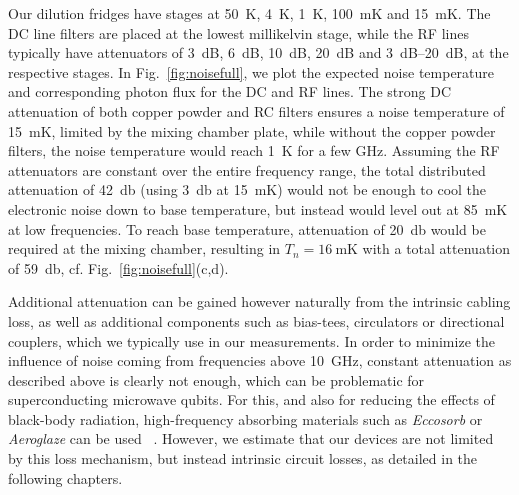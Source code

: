 Our dilution fridges have stages at \SI{50}{\kelvin}, \SI{4}{\kelvin}, \SI{1}{\kelvin}, \SI{100}{\milli\kelvin} and \SI{15}{\milli\kelvin}.
%
The DC line filters are placed at the lowest millikelvin stage, while the RF lines typically have attenuators of \SI{3}{dB}, \SI{6}{dB}, \SI{10}{dB}, \SI{20}{dB} and \SIrange{3}{20}{dB}, at the respective stages.
%
In Fig.~\ref{fig:noisefull}, we plot the expected noise temperature and corresponding photon flux for the DC and RF lines.
%
The strong DC attenuation of both copper powder and RC filters ensures a noise temperature of \SI{15}{\milli\kelvin}, limited by the mixing chamber plate, while without the copper powder filters, the noise temperature would reach \SI{1}{\kelvin} for a few \si{\giga\hertz}.
%
Assuming the RF attenuators are constant over the entire frequency range, the total distributed attenuation of \SI{42}{\decibel} (using \SI{3}{\decibel} at \SI{15}{\milli\kelvin}) would not be enough to cool the electronic noise down to base temperature, but instead would level out at \SI{85}{\milli\kelvin} at low frequencies.
%
To reach base temperature, attenuation of \SI{20}{\decibel} would be required at the mixing chamber, resulting in $T_n=\SI{16}{\milli\kelvin}$ with a total attenuation of \SI{59}{\decibel}, cf. Fig.~\ref{fig:noisefull}(c,d).

Additional attenuation can be gained however naturally from the intrinsic cabling loss, as well as additional components such as bias-tees, circulators or directional couplers, which we typically use in our measurements.
%
In order to minimize the influence of noise coming from frequencies above \SI{10}{\giga\hertz}, constant attenuation as described above is clearly not enough, which can be problematic for superconducting microwave qubits.
%
For this, and also for reducing the effects of black-body radiation, high-frequency absorbing materials such as \textit{Eccosorb} or \textit{Aeroglaze} can be used~ \cite{perskyReviewBlackSurfaces1999,barendsMinimizingQuasiparticleGeneration2011,baselmansUltraLowBackground2012,vanwoerkomOneMinuteParity2015,krinnerEngineeringCryogenicSetups2019}.
%
However, we estimate that our devices are not limited by this loss mechanism, but instead intrinsic circuit losses, as detailed in the following chapters.